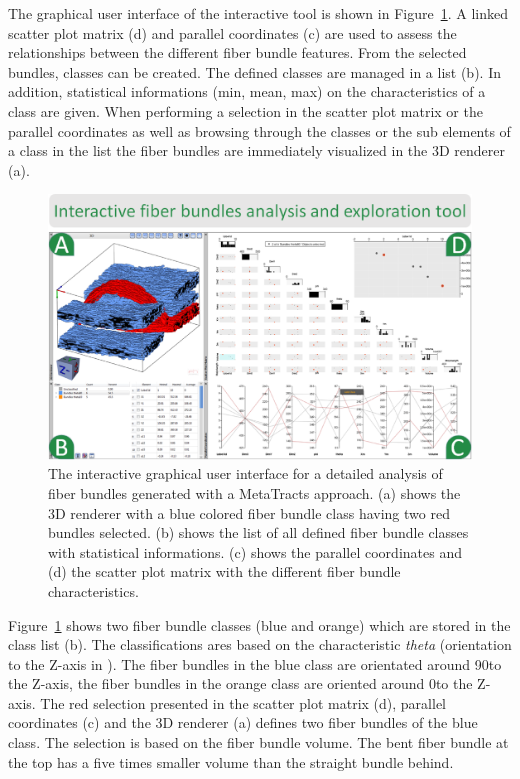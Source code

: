 The graphical user interface of the interactive tool is shown in Figure~\ref{fig:interactive_tool_gui}. A linked scatter plot matrix (d) and parallel coordinates (c) are used to assess the relationships between the different fiber bundle features. From the selected bundles, classes can be created. The defined classes are managed in a list (b). In addition, statistical informations (min, mean, max) on the characteristics of a class are given. When performing a selection in the scatter plot matrix or the parallel coordinates as well as browsing through the classes or the sub elements of a class in the list the fiber bundles are immediately visualized in the 3D renderer (a).
\begin{figure}[htb]
	\centering
	\includegraphics[width=\linewidth]{images/FiberScout_GUI.eps}
	\caption{The interactive graphical user interface for a detailed analysis of fiber bundles generated with a MetaTracts approach. (a) shows the 3D renderer with a blue colored fiber bundle class having two red bundles selected. (b) shows the list of all defined fiber bundle classes with statistical informations. (c) shows the parallel coordinates and (d) the scatter plot matrix with the different fiber bundle characteristics.}
	\label{fig:interactive_tool_gui}
\end{figure}
Figure~\ref{fig:interactive_tool_gui} shows two fiber bundle classes (blue and orange) which are stored in the class list (b). The classifications ares based on the characteristic \textit{theta} (orientation to the Z-axis in \textdegree). The fiber bundles in the blue class are orientated around 90\textdegree to the Z-axis, the fiber bundles in the orange class are oriented around 0\textdegree to the Z-axis. The red selection presented in the scatter plot matrix (d), parallel coordinates (c) and the 3D renderer (a) defines two fiber bundles of the blue class. The selection is based on the fiber bundle volume. The bent fiber bundle at the top has a five times smaller volume than the straight bundle behind.    

